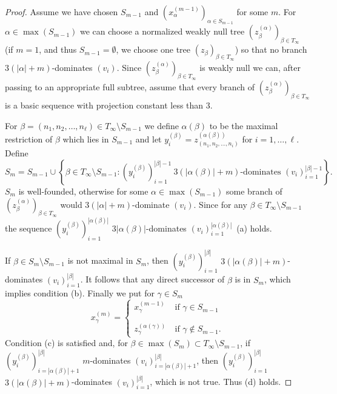 \documentclass[11pt,leqno]{amsart}
\theoremstyle{definition}
\begin{document}
\begin{proof}
  Assume we have chosen $S_{m-1}$ and $(x^{(m-1)}_\alpha)_{\alpha\in
  S_{m-1}}$ for some $m$.
  For $\alpha \in\max( S_{m-1})$ we can choose a  normalized  weakly null tree
  $(z^{(\alpha)}_\beta)_{\beta\in T_\infty}$ (if $m=1$, and thus
  $S_{m-1}=\emptyset$, we
  choose one tree    $(z_\beta)_{\beta\in T_\infty}$)
  so that no branch  $3(|\alpha|+m)$-dominates $(v_i)$. Since
  $(z^{(\alpha)}_\beta)_{\beta\in T_\infty}$  is weakly null we can,
  after passing to an
  appropriate
  full subtree,  assume that every branch of
  $(z^{(\alpha)}_\beta)_{\beta\in T_\infty}$ is a basic sequence with
  projection constant less than $3$.
  
  For $\beta=(n_1,n_2,\ldots,n_\ell)\in T_\infty\setminus S_{m-1}$
  we define $\alpha(\beta)$ to be the maximal restriction of $\beta$
  which lies in $S_{m-1}$
  and  let $y^{(\beta)}_i=z^{(\alpha(\beta))}_{(n_1,n_2,\ldots,n_i)}$ for
  $i=1,\ldots,\ell$. Define 
  \begin{equation*}
    S_m=  S_{m-1}\cup
    \left \{ \beta\in T_\infty\setminus S_{m-1}:
    (y_i^{(\beta)})_{i=1}^{|\beta|-1}\ \text{$3(|\alpha(\beta)|+m)$-dominates }
    (v_i)_{i=1}^{|\beta|-1}
    \right\}.
  \end{equation*}
  $S_m$ is well-founded, otherwise for some $\alpha\in\max(S_{m-1})$
  some branch of $(z^{(\alpha)}_\beta)_{\beta\in T_\infty}$ would
  $3(|\alpha|+m)$-dominate $(v_i)$. Since for any $\beta\in
  T_\infty\setminus S_{m-1}$ the sequence
  $(y^{(\beta)}_i)_{i=1}^{|\alpha(\beta)|}$
  $3|\alpha(\beta)|$-dominates $(v_i)_{i=1}^{|\alpha(\beta)|}$~(a)
  holds.

  If $\beta\in S_m\setminus S_{m-1}$ is not maximal in $S_m$, then 
  $(y^{(\beta)}_i)_{i=1}^{|\beta|}$ $3(|\alpha(\beta)|+m)$-dominates
  $(v_i)_{i=1}^{|\beta|}$. It follows that any direct successor of
  $\beta$ is in $S_m$, which implies condition (b). Finally we put for
  $\gamma\in S_m$
  $$x^{(m)}_\gamma=\begin{cases}  x^{(m-1)}_\gamma &\text{if
    $\gamma\in S_{m-1}$}\\
  \phantom{----}\\
  z^{(\alpha(\gamma))}_\gamma
  &\text{if $\gamma\not\in S_{m-1}$.}
  \end{cases}$$
  Condition (c) is satisfied and, for $\beta\in \max(S_m)\subset
  T_\infty\setminus S_{m-1}$,  if
  $(y_i^{(\beta)})_{i=|\alpha(\beta)|+1}^{|\beta|}$ 
  $m$-dominates  $(v_i)_{i=|\alpha(\beta)|+1}^{|\beta|}$,
  then $(y_i^{(\beta)})^{|\beta|}_{i=1}$
  $3(|\alpha(\beta)|+m)$-dominates $(v_i)_{i=1}^{|\beta|}$, which is
  not true. Thus (d) holds.
  
\end{proof}
\end{document}
